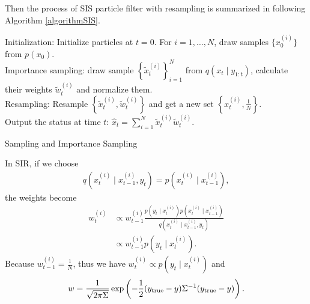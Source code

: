Then the process of SIS particle filter with resampling is summarized in following Algorithm \ref{algorithmSIS}. 
\begin{algorithm}[h]
\SetAlgoLined 
Initialization: Initialize particles at $t=0$. For $i=1, \ldots, N$, draw samples $\lbrace x_0^{(i)}\rbrace$ from $p(x_0)$.\\
 {Importance sampling: draw sample $\left\lbrace \tilde{x}_t^{(i)}\right\rbrace_{i=1}^N$ from $q(x_t \mid y_{1:t})$, calculate their weights $\tilde{w}_t^{(i)}$ and normalize them. \\
Resampling: Resample $\left\lbrace \tilde{x}_t^{(i)}, \tilde{w}_t^{(i)}\right\rbrace$ and get a new set $\left\lbrace x_t^{(i)},\frac{1}{N}\right\rbrace$.\\
Output the status at time $t$: $\hat{x}_t =\sum_{i=1}^{N}\tilde{x}_t^{(i)}\tilde{w}_t^{(i)}$.}
 \caption{Sampling and Importance Sampling}\label{algorithmSIS}
\end{algorithm}


In SIR, if we choose
\begin{align*}
q\left(x_t^{(i)}\mid x_{t-1}^{(i)},y_t\right) = p\left(x_t^{(i)}\mid x_{t-1}^{(i)}\right),
\end{align*}
the weights become
\begin{align*}
w_t^{(i)}&\propto w_{t-1}^{(i)}\frac{ p\left(y_t \mid x_{t}^{(i)}\right) p\left(x_t^{(i)}\mid x_{t-1}^{(i)}\right)}{q\left(x_t^{(i)}\mid x_{t-1}^{(i)},y_t \right)}\\
&\propto w_{t-1}^{(i)}p\left(y_t \mid x_{t}^{(i)}\right).
\end{align*}
Because $w_{t-1}^{(i)}=\frac{1}{N}$, thus we have $w_t^{(i)} \propto p\left(y_t \mid x_{t}^{(i)}\right)$ and
\begin{align*}
w=\frac{1}{\sqrt{2\pi\Sigma}}\exp\left(-\frac{1}{2} (y_{\mbox{\scriptsize true}}-y)\Sigma^{-1}(y_{\mbox{\scriptsize true}}-y)\right).
\end{align*}

